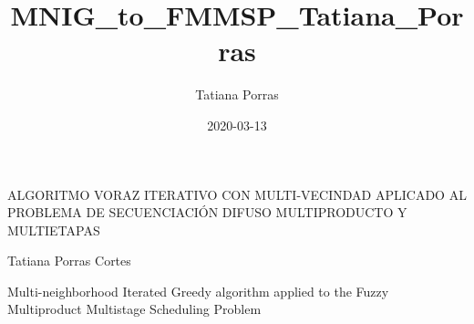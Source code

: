 \documentclass{article}
\title{MNIG_to_FMMSP_Tatiana_Porras}
\date{2020-03-13}
\author{Tatiana Porras}
\begin{document}
\begin{titlepage}
    \begin{center}
    ALGORITMO VORAZ ITERATIVO CON MULTI-VECINDAD APLICADO AL PROBLEMA DE SECUENCIACIÓN DIFUSO MULTIPRODUCTO Y MULTIETAPAS
    
    Tatiana Porras Cortes    
    \end{center}
    
    
\end{titlepage}


Multi-neighborhood Iterated Greedy algorithm applied to the Fuzzy Multiproduct Multistage Scheduling Problem
\end{document}
